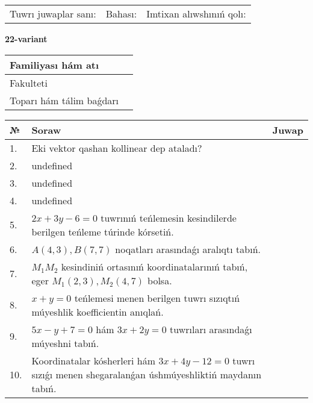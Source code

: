 \documentclass{article}
\begin{document}
\vspace{0.7cm}

\begin{tabular}{lll}
Tuwrı juwaplar sanı: \underline{\hspace{1cm}} & 
Bahası: \underline{\hspace{1cm}} & 
Imtixan alıwshınıń qolı: \underline{\hspace{2cm}} \\
\end{tabular}

\egroup

\newpage


\textbf{22-variant}\\

\bgroup
\def\arraystretch{1.6} %

\begin{tabular}{|m{5.7cm}|m{9.5cm}|}
\hline
Familiyası hám atı & \\
\hline
Fakulteti  & \\
\hline
Toparı hám tálim baǵdarı  & \\
\hline
\end{tabular}

\vspace{0.7cm}

\begin{tabular}{|m{0.7cm}|m{10cm}|m{4cm}|}
\hline
№ & Soraw & Juwap \\
\hline
1. & Eki vektor qashan kollinear dep ataladı? &  \\
\hline
2. & undefined &  \\
\hline
3. & undefined &  \\
\hline
4. & undefined &  \\
\hline
5. & \(2 x + 3 y - 6 = 0\) tuwrınıń teńlemesin kesindilerde berilgen teńleme túrinde kórsetiń. &  \\
\hline
6. & \(A (4, 3), B (7, 7)\) noqatları arasındaǵı aralıqtı tabıń. &  \\
\hline
7. & \(M_{1}M_{2}\) kesindiniń ortasınıń koordinatalarınıń tabıń, eger \(M_{1} (2, 3), M_{2} (4, 7)\) bolsa. &  \\
\hline
8. & \(x + y = 0\) teńlemesi menen berilgen tuwrı sızıqtıń múyeshlik koefficientin anıqlań. &  \\
\hline
9. & \(5 x - y + 7 = 0\) hám \(3 x + 2 y = 0\) tuwrıları arasındaǵı múyeshni tabıń. &  \\
\hline
10. & Koordinatalar kósherleri hám \( 3 x + 4 y - 12 = 0 \) tuwrı sızıǵı menen shegaralanǵan úshmúyeshliktiń maydanın tabıń. & \\
\hline
\end{tabular}
\end{document}
